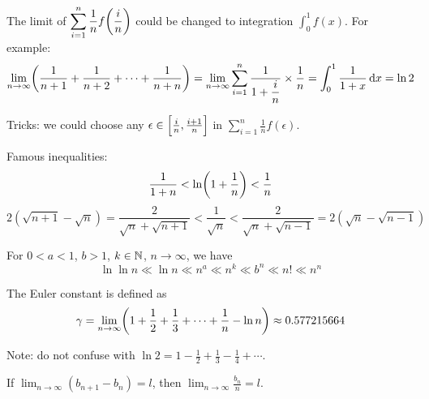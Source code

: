 \begin{example}
    The limit of $\displaystyle \sum_{i=1}^n \frac{1}{n}f\mleft(\frac{i}{n}\mright)$ could be changed to integration $\displaystyle \int_{0}^1 f(x)$. For example:
    \begin{equation}
        \lim_{n \rightarrow \infty} \mleft( \frac{1}{n+1} + \frac{1}{n+2} + \cdots + \frac{1}{n+n} \mright) = \lim_{n \rightarrow \infty} \sum_{i=1}^n \frac{1}{\displaystyle 1+\frac{i}{n}} \times \frac{1}{n} = \int_0^1 \frac{1}{1+x} \dif x = \ln 2
    \end{equation}
    
    Tricks: we could choose any $\epsilon \in \mleft[\frac{i}{n}, \frac{i+1}{n}\mright]$ in $\displaystyle \sum_{i=1}^n \frac{1}{n}f(\epsilon)$.
\end{example}


\begin{example}
    Famous inequalities:
    \begin{equation}
        \frac{1}{1+n} < \ln \mleft(1+\frac{1}{n} \mright) < \frac{1}{n}
    \end{equation}
    \begin{equation}
        2(\sqrt{n+1} - \sqrt{n}) = \frac{2}{\sqrt{n} + \sqrt{n+1}} < \frac{1}{\sqrt{n}} < \frac{2}{\sqrt{n} + \sqrt{n-1}} = 2(\sqrt{n} - \sqrt{n-1} )
    \end{equation}
\end{example}

\begin{example}
    For $0 < a < 1$, $b > 1$, $k \in \mathbb{N}$, $n \rightarrow \infty$, we have
    \begin{equation}
        \ln \ln n \ll \ln n \ll n^a \ll n^k \ll b^n \ll n! \ll n^n
    \end{equation}
\end{example}

\begin{theorem}
    The Euler constant is defined as
    \begin{equation}
        \gamma = \lim_{n \rightarrow \infty} \mleft(1 + \frac{1}{2} + \frac{1}{3} + \cdots + \frac{1}{n} - \ln n \mright) \approx 0.577215664
    \end{equation}
    
    Note: do not confuse with $\ln 2 = 1 - \frac{1}{2} + \frac{1}{3} - \frac{1}{4} + \cdots$.
\end{theorem}

\begin{theorem}
    If $\displaystyle \lim_{n \rightarrow \infty}(b_{n+1} - b_n) = l$, then $\displaystyle \lim_{n\rightarrow \infty} \frac{b_n}{n} = l$.
\end{theorem}


